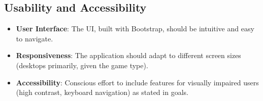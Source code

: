 \subsection*{Usability and Accessibility}
\begin{itemize}
    \item \textbf{User Interface}: The UI, built with Bootstrap, should be intuitive and easy to navigate.
    \item \textbf{Responsiveness}: The application should adapt to different screen sizes (desktops primarily, given the game type).
    \item \textbf{Accessibility}: Conscious effort to include features for visually impaired users (high contrast, keyboard navigation) as stated in goals.
\end{itemize}

